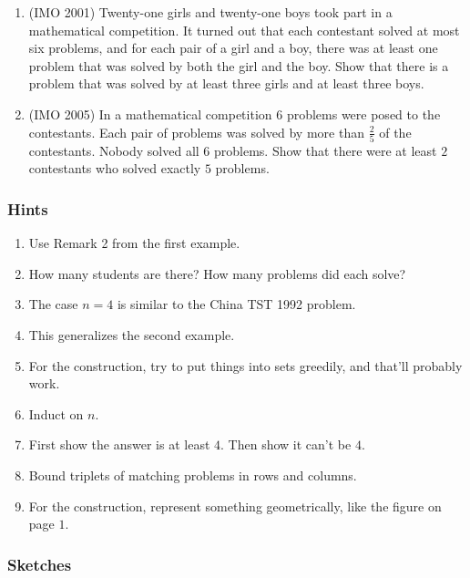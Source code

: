 \documentclass[11pt,paper=letter]{scrartcl}
\begin{document}
\begin{enumerate}[resume]
\item (IMO 2001) Twenty-one girls and twenty-one boys took part in a mathematical competition. It turned out that each contestant solved at most six problems, and for each pair of a girl and a boy, there was at least one problem that was solved by both the girl and the boy. Show that there is a problem that was solved by at least three girls and at least three boys. \hint{\ref{h:9}}

\item (IMO 2005) In a mathematical competition $6$ problems were posed to the contestants. Each pair of problems was solved by more than $\frac25$ of the contestants. Nobody solved all $6$ problems. Show that there were at least $2$ contestants who solved exactly $5$ problems.

\end{enumerate}

\subsubsection*{Hints}

\begin{enumerate}
\item \label{h:6} Use Remark 2 from the first example.
\item \label{h:7} How many students are there? How many problems did each solve?
\item \label{h:4} The case $n = 4$ is similar to the China TST 1992 problem.
\item \label{h:1} This generalizes the second example.
\item \label{h:3} For the construction, try to put things into sets greedily, and that'll probably work.
\item \label{h:5} Induct on $n$.
\item \label{h:8} First show the answer is at least $4$. Then show it can't be $4$.
\item \label{h:9} Bound triplets of matching problems in rows and columns.
\item \label{h:2} For the construction, represent something geometrically, like the figure on page $1$.
\end{enumerate}

\subsubsection*{Sketches}
\end{document}

